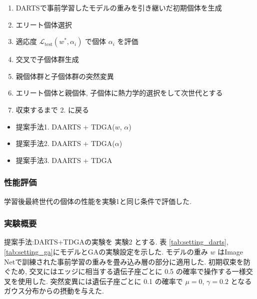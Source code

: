 \begin{enumerate}
  \item DARTSで事前学習したモデルの重みを引き継いだ初期個体を生成
  \item エリート個体選択
  \item 適応度 $\displaystyle \mathcal{L}_{\mathrm{test}}(w^*, \alpha_i)$ で個体 $\alpha_i$ を評価
  \item 交叉で子個体群生成
  \item 親個体群と子個体群の突然変異
  \item エリート個体と親個体, 子個体に熱力学的選択をして次世代とする
  \item 収束するまで 2. に戻る
\end{enumerate}

\begin{itemize}
  \item 提案手法1. DAARTS + TDGA($w$, $\alpha$)
  \item 提案手法2. DAARTS + TDGA($\alpha$)
  \item 提案手法3. DAARTS + TDGA
\end{itemize}


\subsubsection{性能評価}

学習後最終世代の個体の性能を実験1と同じ条件で評価した.


\changeindent{0cm}
\subsubsection{実験概要}
\label{sec:pred.02_03}
\changeindent{2cm}

提案手法:DARTS+TDGAの実験を 実験2 とする.
表 \ref{tab:setting_darts}, \ref{tab:setting_ga}にモデルとGAの実験設定を示した.
モデルの重み $w$ はImage Netで訓練された事前学習の重みを畳み込み層の部分に適用した.
初期収束を防ぐため, 交叉にはエッジに相当する遺伝子座ごとに 0.5 の確率で操作する一様交叉を使用した.
突然変異には遺伝子座ごとに 0.1 の確率で $\mu=0$, $\gamma=0.2$ となるガウス分布からの摂動を与えた.


